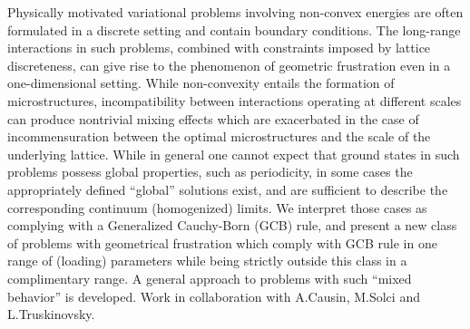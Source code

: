 \mypage
{}
\begin{myabstract}
Physically motivated variational problems involving non-convex energies are often formulated in a discrete setting and contain boundary conditions.  The long-range interactions in such problems, combined with constraints imposed by lattice discreteness, can give rise to the phenomenon of geometric frustration even in a one-dimensional setting. While non-convexity entails the formation of microstructures, incompatibility between interactions operating at different scales can produce nontrivial mixing effects which are exacerbated in the case of incommensuration between the optimal microstructures and the scale of the underlying lattice. While in general one cannot expect that ground states in such problems possess global properties, such as periodicity, in some cases the appropriately defined ``global'' solutions exist, and are sufficient to describe the corresponding continuum (homogenized) limits. We interpret those cases as complying with a Generalized Cauchy-Born (GCB) rule, and present a new class of problems with geometrical frustration which comply with GCB rule in one range of (loading) parameters while being strictly outside this class in a complimentary range. A general approach to problems with such ``mixed behavior'' is developed. Work in collaboration with A.Causin, M.Solci and L.Truskinovsky.
\end{myabstract}

